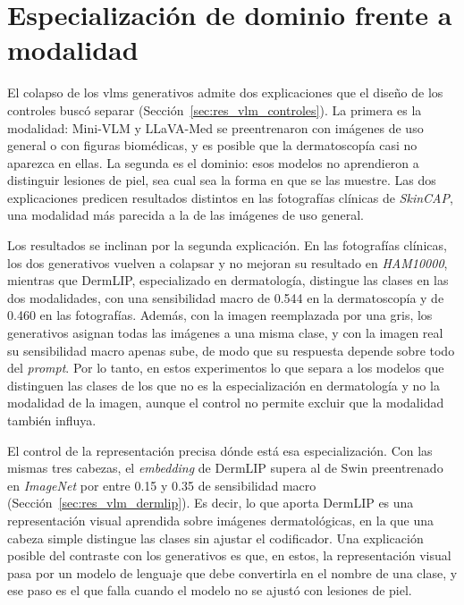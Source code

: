 \section{Especialización de dominio frente a modalidad}
\label{sec:disc_especializacion}

El colapso de los \glspl{vlm} generativos admite dos explicaciones que el diseño de los controles buscó separar
(Sección~\ref{sec:res_vlm_controles}). La primera es la modalidad: Mini-VLM y LLaVA-Med se preentrenaron con
imágenes de uso general o con figuras biomédicas, y es posible que la dermatoscopía casi no aparezca en ellas. La
segunda es el dominio: esos modelos no aprendieron a distinguir lesiones de piel, sea cual sea la forma en que se las
muestre. Las dos explicaciones predicen resultados distintos en las fotografías clínicas de \emph{SkinCAP}, una
modalidad más parecida a la de las imágenes de uso general.

Los resultados se inclinan por la segunda explicación. En las fotografías clínicas, los dos generativos vuelven a
colapsar y no mejoran su resultado en \emph{HAM10000}, mientras que DermLIP, especializado en dermatología, distingue
las clases en las dos modalidades, con una sensibilidad macro de 0.544 en la dermatoscopía y de 0.460 en las
fotografías. Además, con la imagen reemplazada por una gris, los generativos asignan todas las imágenes a una misma
clase, y con la imagen real su sensibilidad macro apenas sube, de modo que su respuesta depende sobre todo del
\emph{prompt}. Por lo tanto, en
estos experimentos lo que separa a los modelos que distinguen las clases de los que no es la especialización en
dermatología y no la modalidad de la imagen, aunque el control no permite excluir que la modalidad también influya.

El control de la representación precisa dónde está esa especialización. Con las mismas tres cabezas, el
\emph{embedding} de DermLIP supera al de Swin preentrenado en \emph{ImageNet} por entre 0.15 y 0.35 de sensibilidad
macro (Sección~\ref{sec:res_vlm_dermlip}). Es decir, lo que aporta DermLIP es una representación visual aprendida
sobre imágenes dermatológicas, en la que una cabeza simple distingue las clases sin ajustar el codificador. Una explicación
posible del contraste con los generativos es que, en estos, la representación visual pasa por un modelo de lenguaje
que debe convertirla en el nombre de una clase, y ese paso es el que falla cuando el modelo no se ajustó con lesiones
de piel.

